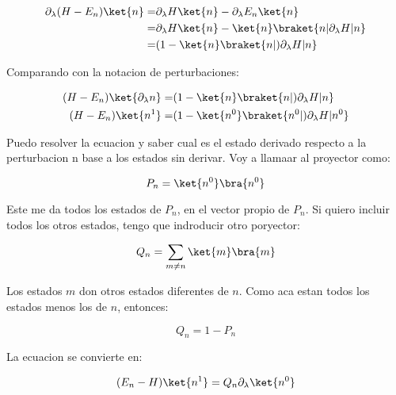 \documentclass[11pt,fleqn]{book}
\begin{document}
\begin{equation}
    \begin{split}
        \partial_{\lambda}(H-E_{n})\ket{n}=&\partial_{\lambda}H\ket{n}-\partial_{\lambda}E_{n}\ket{n}\\
        =&\partial_{\lambda}H\ket{n}-\ket{n}\braket{n|\partial_{\lambda}H|n}\\
        =&(1-\ket{n}\braket{n|)\partial_{\lambda}H|n}\\
    \end{split}
\end{equation}

Comparando con la notacion de perturbaciones: 

\begin{equation}
    \begin{split}
        (H-E_{n})\ket{\partial_{\lambda}n}=&(1-\ket{n}\braket{n|)\partial_{\lambda}H|n}\\
        (H-E_{n})\ket{n^{1}}=&(1-\ket{n^{0}}\braket{n^{0}|)\partial_{\lambda}H|n^{0}}\\
    \end{split}
\end{equation}

Puedo resolver la ecuacion y saber cual es el estado derivado respecto a la perturbacion n base a los estados sin derivar. Voy a llamaar al proyector como:

\begin{equation*}
    P_{n}=\ket{n^{0}}\bra{n^{0}}
\end{equation*}

Este me da todos los estados de $P_{n}$, en el vector propio de $P_{n}$. Si quiero incluir todos los otros estados, tengo que indroducir otro poryector:

\begin{equation*}
    Q_{n}=\sum_{m\neq n}\ket{m}\bra{m}
\end{equation*}

Los estados $m$ don otros estados diferentes de $n$. Como aca estan todos los estados menos los de $n$, entonces:

\begin{equation}
    Q_{n}=1-P_{n}
\end{equation}

La ecuacion se convierte en:

\begin{equation}
    (E_{n}-H)\ket{n^{1}}=Q_{n}\partial_{\lambda}\ket{n^{0}}
\end{equation}
\end{document}

